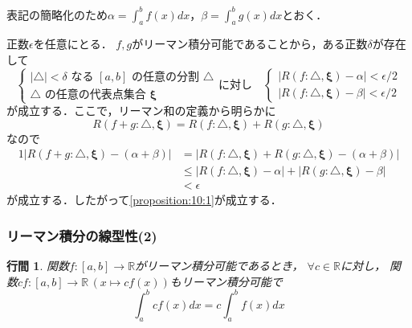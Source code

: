 \documentclass{jsarticle}
\makeatletter
\renewenvironment{proof}[1][\proofname]{\par
        \pushQED{\qed}
        \normalfont
        \topsep6\p@\@plus6\p@ \trivlist
        \item[\hskip\labelsep{\bfseries #1}\@addpunct{\bfseries}]\ignorespaces
    }{%
        \popQED\endtrivlist\@endpefalse
    }
\renewcommand{\proofname}{\underline{証明.}}
\newtheorem{proposition}{行間}
\makeatother
\begin{document}
\begin{proof}
    表記の簡略化のため$\alpha = \int_a^b f(x) dx$，$\beta = \int_a^b g(x) dx$とおく．

    正数$\epsilon$を任意にとる．
    $f, g$がリーマン積分可能であることから，ある正数$\delta$が存在して
    \begin{equation}
        \nonumber
        \begin{cases}
            |\triangle| < \delta \mbox{ なる } [a, b] \mbox{ の任意の分割 } \triangle \\
            \triangle \mbox{ の任意の代表点集合 } \mathbf{\xi}
        \end{cases}
        \mbox{に対し} \quad
        \begin{cases}
            |R(f: \triangle, \mathbf{\xi}) - \alpha| < \epsilon / 2 \\
            |R(f: \triangle, \mathbf{\xi}) - \beta | < \epsilon / 2
        \end{cases}
    \end{equation}
    が成立する．ここで，リーマン和の定義から明らかに
    \begin{equation}
        R(f + g: \triangle, \mathbf{\xi}) = R(f: \triangle, \mathbf{\xi}) + R(g: \triangle, \mathbf{\xi})
    \end{equation}
    なので
    \begin{alignat}{1}
        |R(f + g: \triangle, \mathbf{\xi}) - (\alpha + \beta)|
            &= |R(f: \triangle, \mathbf{\xi}) + R(g: \triangle, \mathbf{\xi}) - (\alpha + \beta)| \\
            &\leq |R(f: \triangle, \mathbf{\xi}) - \alpha| + |R(g: \triangle, \mathbf{\xi}) - \beta| \\
            &< \epsilon
    \end{alignat}
    が成立する．したがって\cref{proposition:10:1}が成立する．
\end{proof}

\subsubsection{リーマン積分の線型性(2)}

\begin{screen}
    \begin{proposition}
        関数$f:[a,b]\rightarrow\mathbb{R}$がリーマン積分可能であるとき，
        $\forall c \in \mathbb{R}$に対し，
        関数$cf: [a,b] \rightarrow \mathbb{R} \, (x \mapsto cf(x))$もリーマン積分可能で
        \begin{equation}
            \int_a^b cf(x) dx = c \int_a^b f(x) dx
            \label{proposition:10:2}
        \end{equation}
    \end{proposition}
\end{screen}
\end{document}
